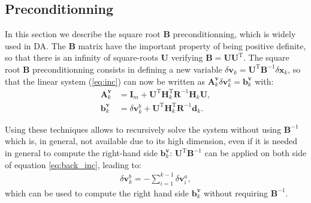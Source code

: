 \documentclass[npg, manuscript]{copernicus}
\begin{document}
\subsection{Preconditionning}
In this section we describe the square root $\mathbf{B}$ preconditionning, which is widely used in DA. 
The $\mathbf{B}$ matrix have the important property of being positive definite, so that there is an infinity of square-roots $\mathbf{U}$ verifying $\mathbf{B} = \mathbf{U} \mathbf{U}^\mathrm{T}$. The square root $\mathbf{B}$ preconditionning consists in defining a new variable $\delta \mathbf{v}_k = \mathbf{U}^\mathrm{T} \mathbf{B}^{-1} \delta \mathbf{x}_k$, so that the linear system (\ref{eq:inc}) can now be written as $\mathbf{A}^\mathbf{v}_k \delta \mathbf{v}^a_k = \mathbf{b}^\mathbf{v}_k$ with:
\begin{align}
\mathbf{A}^\mathbf{v}_k & = \mathbf{I}_m + \mathbf{U}^\mathrm{T} \mathbf{H}_k^\mathrm{T} \mathbf{R}^{-1} \mathbf{H}_k \mathbf{U},\\
\mathbf{b}^\mathbf{v}_k & = \delta \mathbf{v}^b_k + \mathbf{U}^\mathrm{T} \mathbf{H}_k^\mathrm{T} \mathbf{R}^{-1} \mathbf{d}_k.
\end{align}

Using these techniques allows to recursively solve the system without using $\mathbf{B}^{-1}$ which is, in general, not available due to its high dimension, even if it is needed in general to compute the right-hand side $\mathbf{b}^\mathbf{v}_k$: $\mathbf{U}^\mathrm{T} \mathbf{B}^{-1}$ can be applied on both side of equation \eqref{eq:back_inc}, leading to:
\begin{align}
\label{eq:back_inc_U}
\delta \mathbf{v}^b_k = - \sum_{i=1}^{k-1} \delta \mathbf{v}^a_i,
\end{align}
which can be used to compute the right hand side $\mathbf{b}^\mathbf{v}_k$ without requiring $\mathbf{B}^{-1}$.


\end{document}
